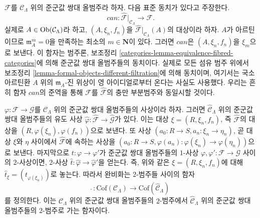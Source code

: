 \begin{remark}
\label{remark-restrict-completion}
$\mathcal{F}$를 $\mathcal{C}_\Lambda$ 위의 준군값 쌍대
올범주라 하자. 다음 표준 동치가 있다고 주장한다.
$$
can :
\widehat{\mathcal{F}}|_{\mathcal{C}_\Lambda}
\longrightarrow
\mathcal{F}.
$$
실제로 $A \in \mathop{\mathrm{Ob}}\nolimits(\mathcal{C}_\Lambda)$라 하고,
$(A, \xi_n, f_n)$을
$\widehat{\mathcal{F}}|_{\mathcal{C}_\Lambda}(A)$의 대상이라 하자.
$A$가 아르틴이므로 $\mathfrak m_A^m = 0$을 만족하는 최소의
$m \in \mathbf{N}$이 있다. 그러면 $can$은 $(A, \xi_n, f_n)$을
$\xi_m$으로 보낸다. 이 함자는 범주론, 보조정리
\ref{categories-lemma-equivalence-fibred-categories}에 의해
준군값 쌍대 올범주들의 동치이다. 실제로 모든 섬유 범주 위에서
보조정리 \ref{lemma-formal-objects-different-filtration}에 의해
동치이며, 여기서는 국소 아르틴환 $A$ 위의
$\mathfrak m_A$-진 위상이 영 아이디얼로부터 온다는 사실도 사용했다.
우리는 흔히 함자 $can$의 준역을 통해 $\mathcal{F}$를
$\widehat{\mathcal{F}}$의 충만 부분범주와 동일시할 것이다.
\end{remark}

\begin{remark}
\label{remark-completion-morphism}
$\varphi : \mathcal{F} \to \mathcal{G}$를 $\mathcal{C}_\Lambda$ 위의
준군값 쌍대 올범주들의 사상이라 하자. 그러면
$\widehat{\mathcal{C}}_\Lambda$ 위의 준군값 쌍대 올범주들의 유도 사상
$\widehat{\varphi}: \widehat{\mathcal{F}} \to \widehat{\mathcal{G}}$가
있다. 이는 대상 $\xi = (R, \xi_n, f_n)$, 즉
$\widehat{\mathcal{F}}$의 대상을 $(R, \varphi(\xi_n), \varphi(f_n))$으로
보낸다. 또 사상 $(a_0 : R \to S, a_n : \xi_n \to \eta_n)$,
곧 대상 $\xi$와 $\eta$ 사이에서 $\widehat{\mathcal{F}}$에 속하는 사상을
$(a_0 : R \to S, \varphi(a_n) : \varphi(\xi_n) \to \varphi(\eta_n))$으로
보낸다. 마지막으로 $t : \varphi \to \varphi'$가 준군값 쌍대
올범주들의 $1$-사상
$\varphi, \varphi': \mathcal{F} \to \mathcal{G}$ 사이의 $2$-사상이면,
$2$-사상 $\widehat{t} : \widehat{\varphi} \to \widehat{\varphi}'$을
얻는다. 즉, 위와 같은 $\xi = (R, \xi_n, f_n)$에 대해
$\widehat{t}_\xi = (t_{\varphi(\xi_n)})$로 놓는다.%
따라서 완비화는 $2$-범주들 사이의 함자
$$
\widehat{~} :
\text{Cof}(\mathcal{C}_\Lambda)
\longrightarrow
\text{Cof}(\widehat{\mathcal{C}}_\Lambda)
$$
를 정의한다. 이는 $\mathcal{C}_\Lambda$ 위의 준군값 쌍대
올범주들의 $2$-범주에서 $\widehat{\mathcal{C}}_\Lambda$ 위의
준군값 쌍대 올범주들의 $2$-범주로 가는 함자이다.
\end{remark}

